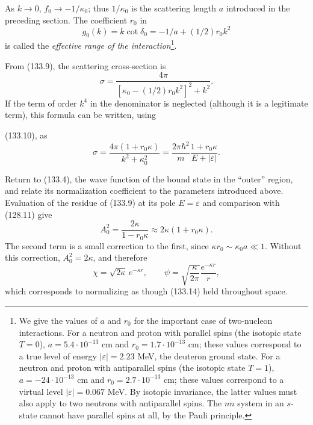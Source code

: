 As $k\to0$, $f_0\to-1/\kappa_0$; thus $1/\kappa_0$ is the scattering length
$a$ introduced in the preceding section. The coefficient $r_0$ in
\begin{equation}
 g_0(k)=k\cot\delta_0=-1/a+(1/2)r_0k^2
 \tag{133.11}
\end{equation}
is called the \emph{effective range of the interaction}\footnote{We give the
values of $a$ and $r_0$ for the important case of two-nucleon interactions.
For a neutron and proton with parallel spins (the isotopic state $T=0$),
$a=5.4\cdot10^{-13}$ cm and $r_0=1.7\cdot10^{-13}$ cm; these values
correspond to a true level of energy $|\varepsilon|=2.23$ MeV, the deuteron
ground state. For a neutron and proton with antiparallel spins (the isotopic
state $T=1$), $a=-24\cdot10^{-13}$ cm and $r_0=2.7\cdot10^{-13}$ cm; these
values correspond to a virtual level $|\varepsilon|=0.067$ MeV. By isotopic
invariance, the latter values must also apply to two neutrons with
antiparallel spins. The $nn$ system in an $s$-state cannot have parallel spins
at all, by the Pauli principle.}.

From (133.9), the scattering cross-section is
\[
 \sigma=\frac{4\pi}{[\kappa_0-(1/2)r_0k^2]^2+k^2}.
\]
If the term of order $k^4$ in the denominator is neglected (although it is a
legitimate term), this formula can be written, using

(133.10), as
\begin{equation}
 \sigma=\frac{4\pi(1+r_0\kappa)}{k^2+\kappa_0^2}
 =\frac{2\pi\hbar^2}{m}\frac{1+r_0\kappa}{E+|\varepsilon|}.
 \tag{133.12}
\end{equation}

Return to (133.4), the wave function of the bound state in the ``outer''
region, and relate its normalization coefficient to the parameters introduced
above. Evaluation of the residue of (133.9) at its pole $E=\varepsilon$ and
comparison with (128.11) give
\begin{equation}
 A_0^2=\frac{2\kappa}{1-r_0\kappa}\approx2\kappa(1+r_0\kappa).
 \tag{133.13}
\end{equation}
The second term is a small correction to the first, since
$\kappa r_0\sim\kappa_0a\ll1$. Without this correction, $A_0^2=2\kappa$, and
therefore
\begin{equation}
 \chi=\sqrt{2\kappa}\,e^{-\kappa r},\qquad
 \psi=\sqrt{\frac{\kappa}{2\pi}}\frac{e^{-\kappa r}}r,
 \tag{133.14}
\end{equation}
which corresponds to normalizing as though (133.14) held throughout space.


